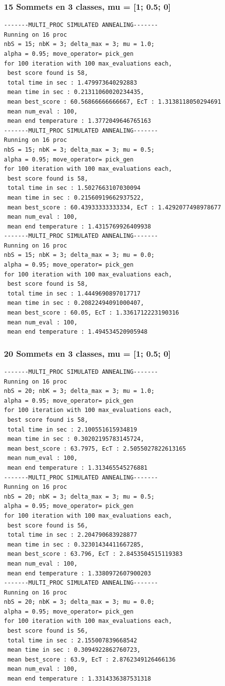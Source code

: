 \documentclass[a4paper]{article}
\begin{document}
\subsubsection{15 Sommets en 3 classes, mu = [1; 0.5; 0]}
\begin{verbatim}
-------MULTI_PROC SIMULATED ANNEALING-------
Running on 16 proc
nbS = 15; nbK = 3; delta_max = 3; mu = 1.0;
alpha = 0.95; move_operator= pick_gen
for 100 iteration with 100 max_evaluations each, 
 best score found is 58,
 total time in sec : 1.479973640292883
 mean time in sec : 0.21311060020234435,
 mean best_score : 60.56866666666667, EcT : 1.3138118050294691
 mean num_eval : 100,
 mean end temperature : 1.3772049646765163
-------MULTI_PROC SIMULATED ANNEALING-------
Running on 16 proc
nbS = 15; nbK = 3; delta_max = 3; mu = 0.5;
alpha = 0.95; move_operator= pick_gen
for 100 iteration with 100 max_evaluations each, 
 best score found is 58,
 total time in sec : 1.5027663107030094
 mean time in sec : 0.21560919662937522,
 mean best_score : 60.43933333333334, EcT : 1.4292077498978677
 mean num_eval : 100,
 mean end temperature : 1.4315769926409938
-------MULTI_PROC SIMULATED ANNEALING-------
Running on 16 proc
nbS = 15; nbK = 3; delta_max = 3; mu = 0.0;
alpha = 0.95; move_operator= pick_gen
for 100 iteration with 100 max_evaluations each, 
 best score found is 58,
 total time in sec : 1.4449690897017717
 mean time in sec : 0.20822494091000407,
 mean best_score : 60.05, EcT : 1.3361712223190316
 mean num_eval : 100,
 mean end temperature : 1.494534520905948
\end{verbatim}
\subsubsection{20 Sommets en 3 classes, mu = [1; 0.5; 0]}
\begin{verbatim}
-------MULTI_PROC SIMULATED ANNEALING-------
Running on 16 proc
nbS = 20; nbK = 3; delta_max = 3; mu = 1.0;
alpha = 0.95; move_operator= pick_gen
for 100 iteration with 100 max_evaluations each, 
 best score found is 58,
 total time in sec : 2.100551615934819
 mean time in sec : 0.30202195783145724,
 mean best_score : 63.7975, EcT : 2.5055027822613165
 mean num_eval : 100,
 mean end temperature : 1.313465545276881
-------MULTI_PROC SIMULATED ANNEALING-------
Running on 16 proc
nbS = 20; nbK = 3; delta_max = 3; mu = 0.5;
alpha = 0.95; move_operator= pick_gen
for 100 iteration with 100 max_evaluations each, 
 best score found is 56,
 total time in sec : 2.204790683928877
 mean time in sec : 0.32301434411667285,
 mean best_score : 63.796, EcT : 2.8453504515119383
 mean num_eval : 100,
 mean end temperature : 1.3380972607900203
-------MULTI_PROC SIMULATED ANNEALING-------
Running on 16 proc
nbS = 20; nbK = 3; delta_max = 3; mu = 0.0;
alpha = 0.95; move_operator= pick_gen
for 100 iteration with 100 max_evaluations each, 
 best score found is 56,
 total time in sec : 2.155007839668542
 mean time in sec : 0.3094922862760723,
 mean best_score : 63.9, EcT : 2.8762349126466136
 mean num_eval : 100,
 mean end temperature : 1.3314336387531318
\end{verbatim}
\end{document}
